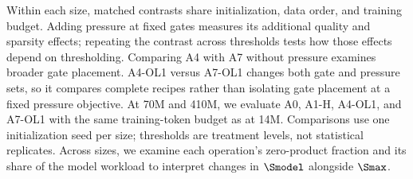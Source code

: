 Within each size, matched contrasts share initialization, data order, and
training budget. Adding pressure at fixed gates measures its additional
quality and sparsity effects; repeating the contrast across thresholds tests
how those effects depend on thresholding. Comparing A4 with A7 without
pressure examines broader gate placement. A4-OL1 versus A7-OL1 changes both
gate and pressure sets, so it compares complete recipes rather than isolating
gate placement at a fixed pressure objective. At 70M and 410M, we evaluate
A0, A1-H, A4-OL1, and A7-OL1 with the same training-token budget as at 14M. Comparisons use one initialization seed
per size; thresholds are treatment levels, not statistical replicates.
Across sizes, we examine each operation's zero-product fraction and its share
of the model workload to interpret changes in $\Smodel$ alongside $\Smax$.

